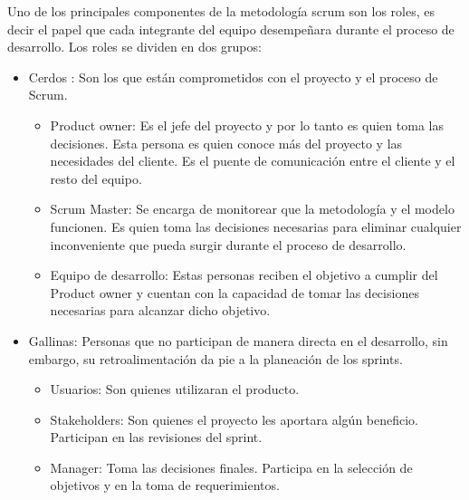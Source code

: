 Uno de los principales componentes de la metodología scrum son los roles, es decir el papel que cada integrante del equipo desempeñara durante el proceso de desarrollo. Los roles se dividen en dos grupos:
\begin{itemize}
	\item Cerdos : Son los que están comprometidos con el proyecto y el proceso de Scrum.
		\begin{itemize}
			\item Product owner: Es el jefe del proyecto y por lo tanto es quien toma las decisiones. Esta persona es quien conoce más del proyecto y las necesidades del cliente. Es el puente de comunicación entre el cliente y el resto del equipo. 
			\item Scrum Master: Se encarga de monitorear que la metodología y el modelo funcionen. Es quien toma las decisiones necesarias para eliminar cualquier inconveniente que pueda surgir durante el proceso de desarrollo. 
			\item Equipo de desarrollo: Estas personas reciben el objetivo a cumplir del Product owner y cuentan con la capacidad de tomar las decisiones necesarias para alcanzar dicho objetivo.
		\end{itemize}
	\item Gallinas: Personas que no participan de manera directa en el desarrollo, sin embargo, su retroalimentación da pie a la planeación de los sprints.
		\begin{itemize}
			\item Usuarios: Son quienes utilizaran el producto.
			\item Stakeholders: Son quienes el proyecto les aportara algún beneficio. Participan en las revisiones del sprint.
			\item Manager: Toma las decisiones finales. Participa en la selección de objetivos y en la toma de requerimientos\cite{Ref_ScrumRef}.
		\end{itemize}
\end{itemize}

